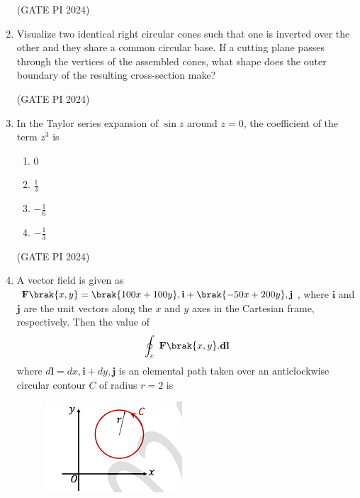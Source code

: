 \documentclass[journal,12pt,onecolumn]{IEEEtran}
\theoremstyle{remark}
\begin{document}
\begin{enumerate}
\hfill (GATE PI 2024)

\item Visualize two identical right circular cones such that one is inverted over the other and they share a common circular base. If a cutting plane passes through the vertices of the assembled cones, what shape does the outer boundary of the resulting cross-section make?

\begin{enumerate}
\end{enumerate}

\hfill (GATE PI 2024)

\item In the Taylor series expansion of $\sin z$ around $z = 0$, the coefficient of the term $z^3$ is

\begin{multicols}{4}
\begin{enumerate}
    \item 0
    \item $\frac{1}{3}$
    \item $-\frac{1}{6}$
    \item $-\frac{1}{3}$
\end{enumerate}
\end{multicols}

\hfill (GATE PI 2024)

\item A vector field is given as $\mathbf{F}\brak{x,y} = \brak{100x + 100y},\mathbf{i} + \brak{-50x + 200y},\mathbf{j}$, where $\mathbf{i}$ and $\mathbf{j}$ are the unit vectors along the $x$ and $y$ axes in the Cartesian frame, respectively. Then the value of
\begin{align*}
\oint_c\ \textbf{F}\brak{x,y}.\textbf{dl}
\end{align*}
where $d\mathbf{l} = dx,\mathbf{i} + dy,\mathbf{j}$ is an elemental path taken over an anticlockwise circular contour $C$ of radius $r = 2$ is

\begin{figure}[H]
\centering
\includegraphics[width=0.5\columnwidth]{fig4.png}
\caption{}
\end{figure}


\end{enumerate}
\end{document}
